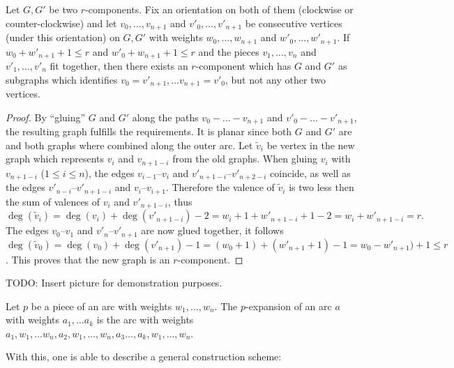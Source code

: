 \begin{lemma}\label{thm:fitting:arcs}
  Let $G, G'$ be two $r$-components. Fix an orientation on both of them (clockwise or counter-clockwise) and let $v_0, \dots, v_{n+1}$ and $v'_0, \dots, v'_{n+1}$ be consecutive vertices (under this orientation) on $G, G'$ with weights $w_0, \dots, w_{n+1}$ and $w'_0, \dots, w'_{n+1}$. If $w_0 + w'_{n+1} + 1 \leq r$ and $w'_0 + w_{n+1} + 1 \leq r$ and the pieces $v_1, \dots, v_n$ and $v'_1, \dots, v'_n$ fit together, then there exists an $r$-component which has $G$ and $G'$ as subgraphs which identifies $v_0 = v'_{n+1}, \dots v_{n+1} = v'_0$, but not any other two vertices.
  \begin{proof}
    By ``gluing'' $G$ and $G'$ along the paths $v_0 - \dots - v_{n+1}$ and $v'_0 - \dots - v'_{n+1}$, the resulting graph fulfills the requirements. It is planar since both $G$ and $G'$ are and both graphs where combined along the outer arc. Let $\tilde{v}_i$ be vertex in the new graph which represents $v_i$ and $v_{n+1-i}$ from the old graphs. When gluing $v_i$ with $v_{n+1-i}$ ($1 \leq i \leq n$), the edges $v_{i-1}$--$v_i$ and $v'_{n + 1 - i}$--$v'_{n + 2 - i}$ coincide, as well as the edges $v'_{n - i}$--$v'_{n + 1 - i}$ and $v_i$--$v_{i+1}$. Therefore the valence of $\tilde{v}_i$ is two less then the sum of valences of $v_i$ and $v'_{n+1-i}$, thus
    \begin{equation*}
      \deg(\tilde{v}_i) = \deg(v_i) + \deg(v'_{n+1-i}) - 2 = w_i + 1 + w'_{n + 1 - i} + 1 - 2 = w_i + w'_{n + 1 - i} = r.
    \end{equation*}
    The edges $v_0$--$v_1$ and $v'_n$--$v'_{n+1}$ are now glued together, it follows $\deg(\tilde{v}_0) = \deg(v_0) + \deg(v'_{n+1}) - 1 = (w_0 + 1) + (w'_{n+1} + 1) - 1 = w_0 - w'_{n+1}) + 1 \leq r$. This proves that the new graph is an $r$-component.
  \end{proof}
\end{lemma}

TODO: Insert picture for demonstration purposes.

\begin{definition}
  Let $p$ be a piece of an arc with weights $w_1, \dots, w_{n}$. The $p$-expansion of an arc $a$ with weights $a_1, \dots a_k$ is the arc with weights $a_1, w_1, \dots w_n, a_2, w_1, \dots, w_n, a_3 \dots, a_k, w_1, \dots, w_n$.
\end{definition}

With this, one is able to describe a general construction scheme:

